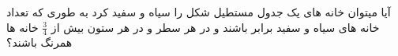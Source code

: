 \exercise
آیا میتوان خانه های یک جدول مستطیل شکل را سیاه و سفید کرد به طوری که تعداد خانه های سیاه و سفید برابر باشند و در هر سطر و در هر ستون بیش از
$\frac{3}{4}$
خانه ها همرنگ باشند؟